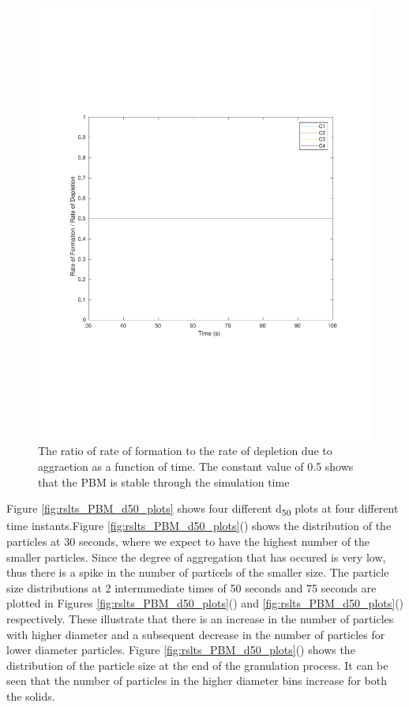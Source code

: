\documentclass[preprint,11pt,authoryear]{elsarticle}
\begin{document}
\begin{figure}[H]
\begin{center}
\includegraphics[scale=0.5]{rslts_PBM_2mm_validation.pdf}
\caption{The ratio of rate of formation to the rate of depletion due to aggraetion as a function of time. The constant value of 0.5 shows that the PBM is stable through the simulation time}
\label{fig:rslts_PBM_ratio_plot_2mm}
\end{center}
\end{figure}
Figure \ref{fig:rslts_PBM_d50_plots} shows four different d\textsubscript{50} plots at four different time instants.Figure \ref{fig:rslts_PBM_d50_plots}() shows the distribution of the particles at 30 seconds, where we expect to have the highest number of the smaller particles. Since the degree of aggregation that has occured is very low, thus there is a spike in the number of particels of the smaller size. The particle size distributions at 2 intermmediate times of 50 seconds and 75 seconds are plotted in Figures \ref{fig:rslts_PBM_d50_plots}() and \ref{fig:rslts_PBM_d50_plots}() respectively. These illustrate that there is an increase in the number of particles with higher diameter and a subsequent decrease in the number of particles for lower diameter particles. Figure \ref{fig:rslts_PBM_d50_plots}() shows the distribution of the particle size at the end of the granulation process. It can be seen that the number of particles in the higher diameter bins increase for both the solids. 
\end{document}
